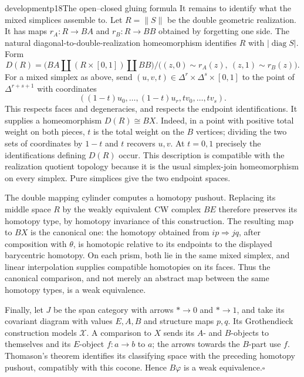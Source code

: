 \begin{dcomment}{development}{p18}{The open--closed gluing formula}
It remains to identify what the mixed simplices assemble to. Let $R=\lVert S\rVert$ be the double geometric realization. It has maps $r_A:R\to BA$ and $r_B:R\to BB$ obtained by forgetting one side. The natural diagonal-to-double-realization homeomorphism identifies $R$ with $|\operatorname{diag}S|$. Form
\[
 D(R)=\bigl(BA\amalg(R\times[0,1])\amalg BB\bigr)
       /\bigl((z,0)\sim r_A(z),\ (z,1)\sim r_B(z)\bigr).
\]
For a mixed simplex as above, send $(u,v,t)\in\Delta^r\times\Delta^s\times[0,1]$ to the point of $\Delta^{r+s+1}$ with coordinates
\[
 ((1-t)u_0,\ldots,(1-t)u_r,tv_0,\ldots,tv_s).
\]
This respects faces and degeneracies, and respects the endpoint identifications. It supplies a homeomorphism $D(R)\cong BX$. Indeed, in a point with positive total weight on both pieces, $t$ is the total weight on the $B$ vertices; dividing the two sets of coordinates by $1-t$ and $t$ recovers $u,v$. At $t=0,1$ precisely the identifications defining $D(R)$ occur. This description is compatible with the realization quotient topology because it is the usual simplex-join homeomorphism on every simplex. Pure simplices give the two endpoint spaces.

The double mapping cylinder computes a homotopy pushout. Replacing its middle space $R$ by the weakly equivalent CW complex $BE$ therefore preserves its homotopy type, by homotopy invariance of this construction. The resulting map to $BX$ is the canonical one: the homotopy obtained from $ip\Rightarrow jq$, after composition with $\theta$, is homotopic relative to its endpoints to the displayed barycentric homotopy. On each prism, both lie in the same mixed simplex, and linear interpolation supplies compatible homotopies on its faces. Thus the canonical comparison, and not merely an abstract map between the same homotopy types, is a weak equivalence.

Finally, let $J$ be the span category with arrows $*\to0$ and $*\to1$, and take its covariant diagram with values $E,A,B$ and structure maps $p,q$. Its Grothendieck construction models $\mathcal X$. A comparison to $X$ sends its $A$- and $B$-objects to themselves and its $E$-object $f:a\to b$ to $a$; the arrows towards the $B$-part use $f$. Thomason's theorem identifies its classifying space with the preceding homotopy pushout, compatibly with this cocone. Hence $B\varphi$ is a weak equivalence.\hfill$\square$


\end{dcomment}
